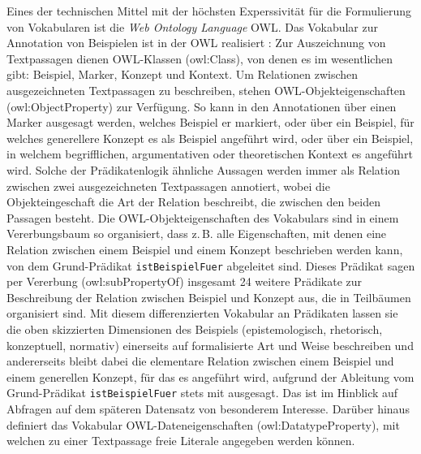 \documentclass{article}
\newcommand*{\vokabular}{\texttt}%
\newcommand*{\englisch}[1]{\foreignlanguage{english}{\textit{#1}}}%
\begin{document}
Eines der technischen Mittel mit der höchsten Experssivität für die
Formulierung von Vokabularen ist die \englisch{Web Ontology Language}
OWL. Das Vokabular zur Annotation von Beispielen ist in der OWL
realisiert \parencite{CL2018a}: Zur Auszeichnung von Textpassagen
dienen OWL-Klassen (owl:Class), von denen es im wesentlichen gibt:
Beispiel, Marker, Konzept und Kontext. Um Relationen zwischen
ausgezeichneten Textpassagen zu beschreiben, stehen
OWL-Objekteigenschaften (owl:ObjectProperty) zur Verfügung. So kann in
den Annotationen über einen Marker ausgesagt werden, welches Beispiel
er markiert, oder über ein Beispiel, für welches generellere Konzept
es als Beispiel angeführt wird, oder über ein Beispiel, in welchem
begrifflichen, argumentativen oder theoretischen Kontext es angeführt
wird. Solche der Prädikatenlogik ähnliche Aussagen werden immer als
Relation zwischen zwei ausgezeichneten Textpassagen annotiert, wobei
die Objekteingeschaft die Art der Relation beschreibt, die zwischen
den beiden Passagen besteht. Die OWL-Objekteigenschaften des
Vokabulars sind in einem Vererbungsbaum so organisiert, dass
z.\,B. alle Eigenschaften, mit denen eine Relation zwischen einem
Beispiel und einem Konzept beschrieben werden kann, von dem
Grund-Prädikat \vokabular{istBeispielFuer} abgeleitet sind. Dieses
Prädikat sagen per Vererbung (owl:subPropertyOf) insgesamt 24 weitere
Prädikate zur Beschreibung der Relation zwischen Beispiel und Konzept
aus, die in Teilbäumen organisiert sind. Mit diesem differenzierten
Vokabular an Prädikaten lassen sie die oben skizzierten Dimensionen
des Beispiels (epistemologisch, rhetorisch, konzeptuell, normativ)
einerseits auf formalisierte Art und Weise beschreiben und
andererseits bleibt dabei die elementare Relation zwischen einem
Beispiel und einem generellen Konzept, für das es angeführt wird,
aufgrund der Ableitung vom Grund-Prädikat \vokabular{istBeispielFuer}
stets mit ausgesagt. Das ist im Hinblick auf Abfragen auf dem
späteren Datensatz von besonderem Interesse. Darüber hinaus definiert
das Vokabular OWL-Dateneigenschaften (owl:DatatypeProperty), mit
welchen zu einer Textpassage freie Literale angegeben werden können.
\end{document}
